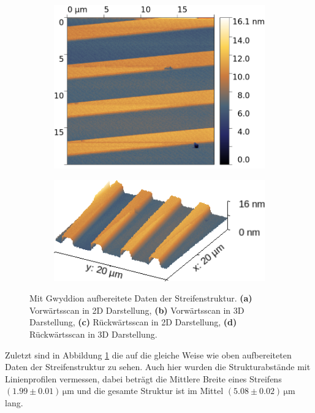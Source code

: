 \begin{figure}[H]
    \begin{subfigure}{0.49\textwidth}
        \includegraphics[width=\textwidth]{bilder/Mikrostruktur/Streifen_Bac_2D.png}
        \caption{}
    \end{subfigure}
    \begin{subfigure}{0.49\textwidth}
        \includegraphics[width=\textwidth]{bilder/Mikrostruktur/Streifen_Bac_3D.png}
        \caption{}
    \end{subfigure}
    \caption{Mit Gwyddion aufbereitete Daten der Streifenstruktur. \textbf{(a)} Vorwärtsscan in 2D Darstellung, \textbf{(b)} Vorwärtsscan in 3D Darstellung, \textbf{(c)} Rückwärtsscan in 2D Darstellung, \textbf{(d)} Rückwärtsscan in 3D Darstellung.}
    \label{fig:Streifen}
\end{figure}

Zuletzt sind in Abbildung \ref{fig:Streifen} die auf die gleiche Weise wie oben aufbereiteten Daten der Streifenstruktur zu sehen.
Auch hier wurden die Strukturabstände mit Linienprofilen vermessen, dabei beträgt die Mittlere Breite eines Streifens $(1.99\pm 0.01)\,\si{\micro\meter}$ und 
die gesamte Struktur ist im Mittel $(5.08\pm 0.02)\,\si{\micro\meter}$ lang. 


